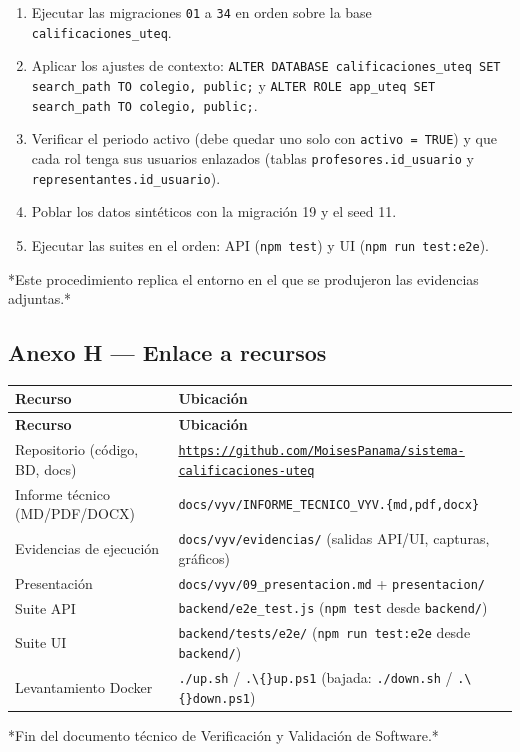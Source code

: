 \documentclass[11pt,a4paper]{article}
\begin{document}
\begin{enumerate}[leftmargin=*]
\item Ejecutar las migraciones \texttt{01} a \texttt{34} en orden sobre la base \texttt{calificaciones\_uteq}.
\item Aplicar los ajustes de contexto: \texttt{ALTER DATABASE calificaciones\_uteq SET search\_path TO colegio, public;} y \texttt{ALTER ROLE app\_uteq SET search\_path TO colegio, public;}.
\item Verificar el periodo activo (debe quedar uno solo con \texttt{activo = TRUE}) y que cada rol tenga sus usuarios enlazados (tablas \texttt{profesores.id\_usuario} y \texttt{representantes.id\_usuario}).
\item Poblar los datos sintéticos con la migración 19 y el seed 11.
\item Ejecutar las suites en el orden: API (\texttt{npm test}) y UI (\texttt{npm run test:e2e}).
\end{enumerate}


*Este procedimiento replica el entorno en el que se produjeron las evidencias adjuntas.*


\subsection*{Anexo H --- Enlace a recursos}


{\small
\begin{longtable}{|p{}|p{}|}
\rowcolor{UTECblue}\color{white}\bfseries Recurso & \color{white}\bfseries Ubicación \\ \hline
\endfirsthead
\rowcolor{UTECblue}\color{white}\bfseries Recurso & \color{white}\bfseries Ubicación \\ \hline
\endhead
Repositorio (código, BD, docs) & \texttt{\url{https://github.com/MoisesPanama/sistema-calificaciones-uteq}} \\ \hline
Informe técnico (MD/PDF/DOCX) & \texttt{docs/vyv/INFORME\_TECNICO\_VYV.\{md,pdf,docx\}} \\ \hline
Evidencias de ejecución & \texttt{docs/vyv/evidencias/} (salidas API/UI, capturas, gráficos) \\ \hline
Presentación & \texttt{docs/vyv/09\_presentacion.md} + \texttt{presentacion/} \\ \hline
Suite API & \texttt{backend/e2e\_test.js} (\texttt{npm test} desde \texttt{backend/}) \\ \hline
Suite UI & \texttt{backend/tests/e2e/} (\texttt{npm run test:e2e} desde \texttt{backend/}) \\ \hline
Levantamiento Docker & \texttt{./up.sh} / \texttt{.\textbackslash\{\}up.ps1} (bajada: \texttt{./down.sh} / \texttt{.\textbackslash\{\}down.ps1}) \\ \hline
\end{longtable}}


*Fin del documento técnico de Verificación y Validación de Software.*
\end{document}
